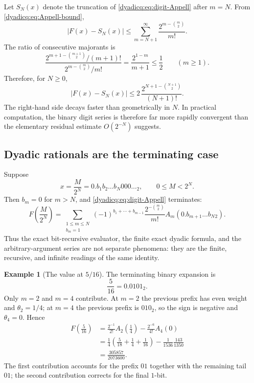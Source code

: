 \documentclass[11pt,oneside]{article}
\theoremstyle{definition}
\newtheorem{example}[theorem]{Example}
\theoremstyle{remark}
\begin{document}
Let $S_N(x)$ denote the truncation of \eqref{dyadicq:eq:digit-Appell} after $m=N$.
From \eqref{dyadicq:eq:Appell-bound},
\[
 |F(x)-S_N(x)|
 \le\sum_{m=N+1}^{\infty}\frac{2^{m-\binom m2}}{m!}.
\]
The ratio of consecutive majorants is
\[
 \frac{2^{m+1-\binom{m+1}{2}}/(m+1)!}
      {2^{m-\binom m2}/m!}
 =\frac{2^{1-m}}{m+1}\le\frac12
 \qquad(m\ge1).
\]
Therefore, for $N\ge0$,
\begin{equation}\label{dyadicq:eq:digit-tail-bound}
 \boxed{
  |F(x)-S_N(x)|
  \le 2\,\frac{2^{N+1-\binom{N+1}{2}}}{(N+1)!}.}
\end{equation}
The right-hand side decays faster than geometrically in $N$.  In practical
computation, the binary digit series is therefore far more rapidly convergent
than the elementary residual estimate $O(2^{-N})$ suggests.

\subsection{Dyadic rationals are the terminating case}

Suppose
\[
 x=\frac{M}{2^N}=0.b_1b_2\ldots b_N000\ldots{}_2,
 \qquad 0\le M<2^N.
\]
Then $b_m=0$ for $m>N$, and \eqref{dyadicq:eq:digit-Appell} terminates:
\begin{equation}\label{dyadicq:eq:dyadic-digit-Appell}
 \boxed{
 F\!\left(\frac{M}{2^N}\right)
 =\sum_{\substack{1\le m\le N\\b_m=1}}
 (-1)^{b_1+\cdots+b_{m-1}}
 \frac{2^{-\binom m2}}{m!}
 A_m\!\left(0.b_{m+1}\ldots b_N{}_2\right).}
\end{equation}
Thus the exact bit-recursive evaluator, the finite exact dyadic formula, and
the arbitrary-argument series are not separate phenomena: they are the finite,
recursive, and infinite readings of the same identity.

\begin{example}[The value at $5/16$]\label{dyadicq:ex:five-sixteen}
The terminating binary expansion is
\[
 \frac5{16}=0.0101_2.
\]
Only $m=2$ and $m=4$ contribute.  At $m=2$ the previous prefix has even
weight and $\theta_2=1/4$; at $m=4$ the previous prefix is $010_2$, so the
sign is negative and $\theta_4=0$.  Hence
\begin{align*}
 F\!\left(\frac5{16}\right)
 &=\frac{2^{-1}}{2!}A_2\!\left(\frac14\right)
   -\frac{2^{-6}}{4!}A_4(0)\\
 &=\frac14\left(\frac5{18}+\frac14+\frac1{16}\right)
   -\frac1{1536}\frac{143}{1350}\\
 &=\frac{305857}{2073600}.
\end{align*}
The first contribution accounts for the prefix $01$ together with the
remaining tail $01$; the second contribution corrects for the final $1$-bit.
\end{example}
\end{document}
